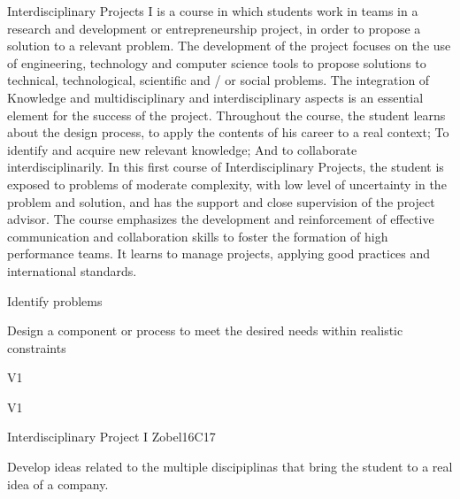 \begin{syllabus}


\begin{justification}
Interdisciplinary Projects I is a course in which students work in teams in a research and development or entrepreneurship project, in order to propose a solution to a relevant problem. The development of the project focuses on the use of engineering, technology and computer science tools to propose solutions to technical, technological, scientific and / or social problems. The integration of
Knowledge and multidisciplinary and interdisciplinary aspects is an essential element for the success of the project. Throughout the course, the student learns about the design process, to apply the contents of his career to a real context; To identify and acquire new relevant knowledge; And to collaborate interdisciplinarily. In this first course of Interdisciplinary Projects, the student is exposed to problems of moderate complexity, with low level of uncertainty in the problem and solution, and has the support and close supervision of the project advisor. The course emphasizes the development and reinforcement of effective communication and collaboration skills to foster the formation of high performance teams.
It learns to manage projects, applying good practices and international standards.
\end{justification}

\begin{goals}
   \item Identify problems
   \item Design a component or process to meet the desired needs within realistic constraints
   
\end{goals}

\begin{outcomes}{V1}
   \item {}
   \item {}
\end{outcomes}

\begin{competences}{V1}
    \item {}
    \item {}
\end{competences}

\begin{unit}{Interdisciplinary Project I }{}{Zobel}{16}{C17}
\begin{topics}
      \item Develop ideas related to the multiple discipiplinas that bring the student to a real idea of a company.
\end{topics}


\end{unit}
\end{syllabus}
